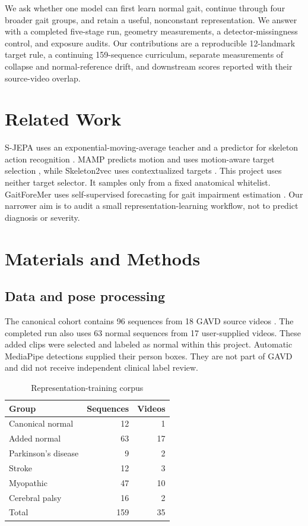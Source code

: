 \documentclass[conference]{IEEEtran}
\begin{document}
We ask whether one model can first learn normal gait, continue through four broader gait groups, and retain a useful, nonconstant representation. We answer with a completed five-stage run, geometry measurements, a detector-missingness control, and exposure audits. Our contributions are a reproducible 12-landmark target rule, a continuing 159-sequence curriculum, separate measurements of collapse and normal-reference drift, and downstream scores reported with their source-video overlap.

\section{Related Work}
S-JEPA uses an exponential-moving-average teacher and a predictor for skeleton action recognition \cite{abdelfattah2024sjepa}. MAMP predicts motion and uses motion-aware target selection \cite{mao2023mamp}, while Skeleton2vec uses contextualized targets \cite{xu2024skeleton2vec}. This project uses neither target selector. It samples only from a fixed anatomical whitelist. GaitForeMer uses self-supervised forecasting for gait impairment estimation \cite{endo2022gaitforemer}. Our narrower aim is to audit a small representation-learning workflow, not to predict diagnosis or severity.

\section{Materials and Methods}
\subsection{Data and pose processing}
The canonical cohort contains 96 sequences from 18 GAVD source videos \cite{ranjan2025gavd}. The completed run also uses 63 normal sequences from 17 user-supplied videos. These added clips were selected and labeled as normal within this project. Automatic MediaPipe detections supplied their person boxes. They are not part of GAVD and did not receive independent clinical label review.

\begin{table}[t]
\caption{Representation-training corpus}
\label{tab:cohort}
\centering
\scriptsize
\begin{tabular}{lrr}
\toprule
Group & Sequences & Videos \\
\midrule
Canonical normal & 12 & 1 \\
Added normal & 63 & 17 \\
Parkinson's disease & 9 & 2 \\
Stroke & 12 & 3 \\
Myopathic & 47 & 10 \\
Cerebral palsy & 16 & 2 \\
\midrule
Total & 159 & 35 \\
\bottomrule
\end{tabular}
\end{table}
\end{document}
